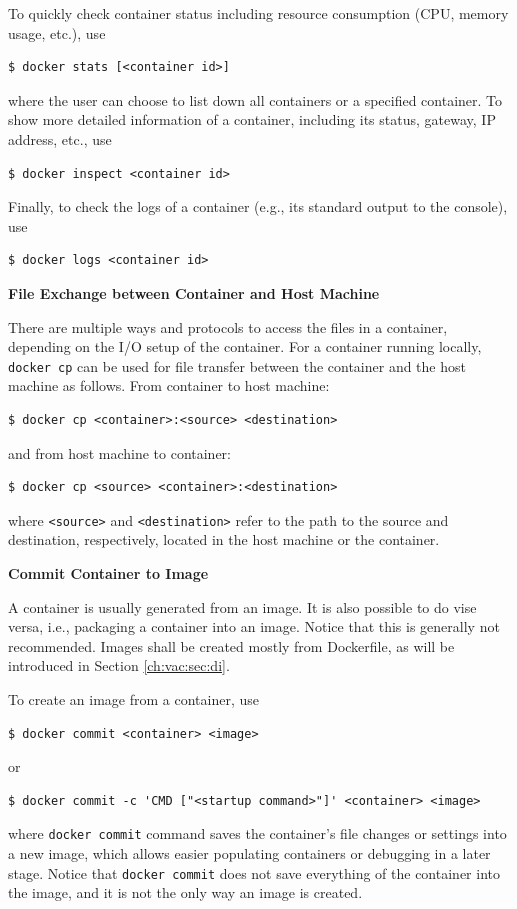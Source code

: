 To quickly check container status including resource consumption (CPU, memory usage, etc.), use
\begin{lstlisting}
$ docker stats [<container id>]
\end{lstlisting}
where the user can choose to list down all containers or a specified container. To show more detailed information of a container, including its status, gateway, IP address, etc., use
\begin{lstlisting}
$ docker inspect <container id>
\end{lstlisting}
Finally, to check the logs of a container (e.g., its standard output to the console), use
\begin{lstlisting}
$ docker logs <container id>
\end{lstlisting}

\vspace{0.1in}
\noindent \textbf{File Exchange between Container and Host Machine}
\vspace{0.1in}

There are multiple ways and protocols to access the files in a container, depending on the I/O setup of the container. For a container running locally, \verb|docker cp| can be used for file transfer between the container and the host machine as follows. From container to host machine:
\begin{lstlisting}
$ docker cp <container>:<source> <destination>
\end{lstlisting}
and from host machine to container:
\begin{lstlisting}
$ docker cp <source> <container>:<destination>
\end{lstlisting}
where \verb|<source>| and \verb|<destination>| refer to the path to the source and destination, respectively, located in the host machine or the container.

\vspace{0.1in}
\noindent \textbf{Commit Container to Image}
\vspace{0.1in}

A container is usually generated from an image. It is also possible to do vise versa, i.e., packaging a container into an image. Notice that this is generally not recommended. Images shall be created mostly from Dockerfile, as will be introduced in Section \ref{ch:vac:sec:di}.

To create an image from a container, use
\begin{lstlisting}
$ docker commit <container> <image>
\end{lstlisting}
or
\begin{lstlisting}
$ docker commit -c 'CMD ["<startup command>"]' <container> <image>
\end{lstlisting}
where \verb|docker commit| command saves the container's file changes or settings into a new image, which allows easier populating containers or debugging in a later stage. Notice that \verb|docker commit| does not save everything of the container into the image, and it is not the only way an image is created.

